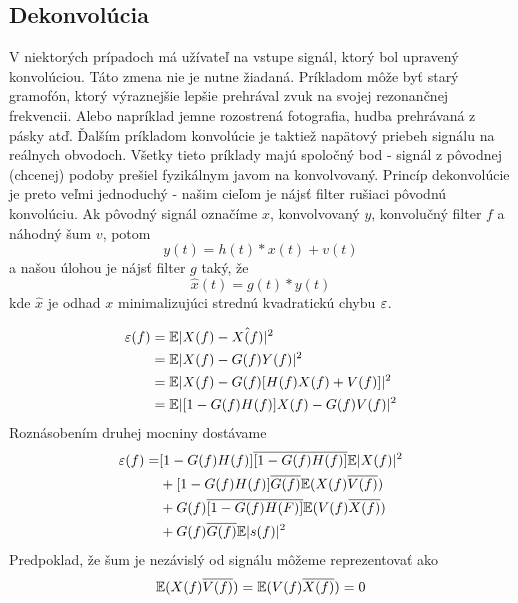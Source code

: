\subsection{Dekonvolúcia}

V niektorých prípadoch má užívateľ na vstupe signál, ktorý bol
upravený konvolúciou. Táto zmena nie je nutne žiadaná. Príkladom môže
byť starý gramofón, ktorý výraznejšie lepšie prehrával zvuk na
svojej rezonančnej frekvencii. Alebo napríklad jemne rozostrená
fotografia, hudba prehrávaná z pásky atď. Ďalším príkladom konvolúcie
je taktiež napätový priebeh  signálu na reálnych
obvodoch. Všetky tieto príklady majú spoločný bod - signál z pôvodnej
(chcenej) podoby prešiel fyzikálnym javom na konvolvovaný. Princíp
dekonvolúcie je preto veľmi jednoduchý - našim cieľom je nájsť filter
rušiaci pôvodnú konvolúciu.
Ak pôvodný signál označíme $x$, konvolvovaný $y$, konvolučný
filter $f$ a náhodný šum $v$, potom
\begin{equation}
    y(t) = h(t)*x(t) + v(t)
\end{equation}
a našou úlohou je nájsť filter $g$ taký, že
\begin{equation}
  \hat{x}(t) = g(t)*y(t)
\end{equation}
kde $\hat{x}$ je odhad $x$ minimalizujúci strednú kvadratickú chybu
$\varepsilon$.

\def\E{{\mathbb{E}}}
\begin{equation}
\begin{split}
\eps(f) &= \E | X(f) - \hat{X(f)}|^2 \\
        &= \E | X(f) - G(f) Y(f)| ^2 \\
        &= \E | X(f) - G(f) [ H(f) X(f) +V(f)]|^2 \\
        &= \E | [ 1 - G(f) H(f)] X(f) - G(f) V(f)|^2
\end{split}        
\end{equation}
Roznásobením druhej mocniny dostávame
\begin{equation}
\begin{split}
\eps(f) =& [1 - G(f) H(f)]\conjug{[1 - G(f) H(f)]} \E| X(f)|^2 \\
  &+ [1-G(f) H(f)]\conjug{G(f)} \E( X(f) \conjug{V(f)}) \\
  &+ G(f) \conjug{[1-G(f)H(F)]} \E( V(f) \conjug{X(f)}) \\
  &+ G(f) \conjug{G(f)} \E|s(f)|^2
\end{split}
\end{equation}
Predpoklad, že šum je nezávislý od signálu môžeme reprezentovať ako
\begin{equation}
 \E( X(f)\conjug{V(f)}) = \E(V(f)\conjug{X(f)}) = 0
\end{equation}

